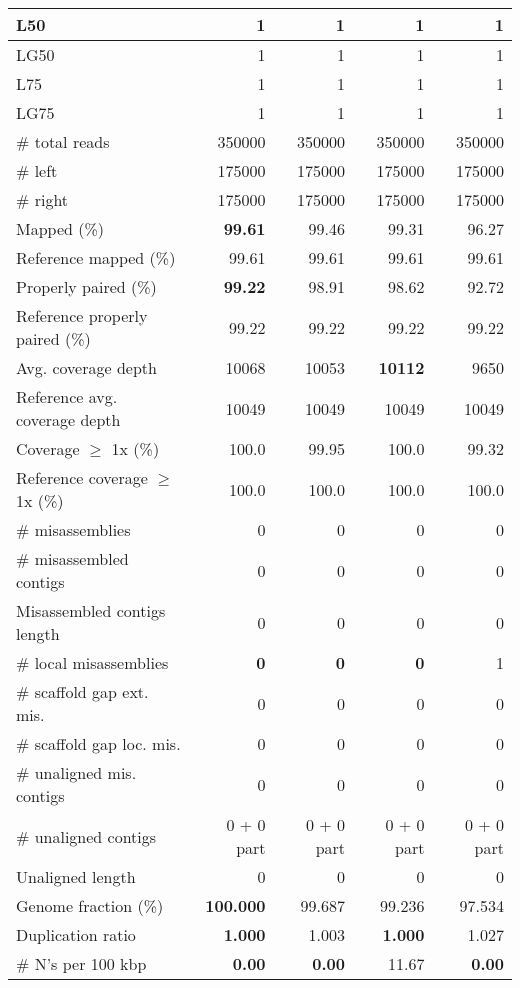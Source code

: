 \documentclass[12pt,a4paper]{article}
\begin{document}
\begin{table}[ht]
\begin{center}
\begin{tabular}{|l*{4}{|r}|}
L50 & 1 & 1 & 1 & 1 \\ \hline
LG50 & 1 & 1 & 1 & 1 \\ \hline
L75 & 1 & 1 & 1 & 1 \\ \hline
LG75 & 1 & 1 & 1 & 1 \\ \hline
\# total reads & 350000 & 350000 & 350000 & 350000 \\ \hline
\# left & 175000 & 175000 & 175000 & 175000 \\ \hline
\# right & 175000 & 175000 & 175000 & 175000 \\ \hline
Mapped (\%) & {\bf 99.61} & 99.46 & 99.31 & 96.27 \\ \hline
Reference mapped (\%) & 99.61 & 99.61 & 99.61 & 99.61 \\ \hline
Properly paired (\%) & {\bf 99.22} & 98.91 & 98.62 & 92.72 \\ \hline
Reference properly paired (\%) & 99.22 & 99.22 & 99.22 & 99.22 \\ \hline
Avg. coverage depth & 10068 & 10053 & {\bf 10112} & 9650 \\ \hline
Reference avg. coverage depth & 10049 & 10049 & 10049 & 10049 \\ \hline
Coverage $\geq$ 1x (\%) & 100.0 & 99.95 & 100.0 & 99.32 \\ \hline
Reference coverage $\geq$ 1x (\%) & 100.0 & 100.0 & 100.0 & 100.0 \\ \hline
\# misassemblies & 0 & 0 & 0 & 0 \\ \hline
\# misassembled contigs & 0 & 0 & 0 & 0 \\ \hline
Misassembled contigs length & 0 & 0 & 0 & 0 \\ \hline
\# local misassemblies & {\bf 0} & {\bf 0} & {\bf 0} & 1 \\ \hline
\# scaffold gap ext. mis. & 0 & 0 & 0 & 0 \\ \hline
\# scaffold gap loc. mis. & 0 & 0 & 0 & 0 \\ \hline
\# unaligned mis. contigs & 0 & 0 & 0 & 0 \\ \hline
\# unaligned contigs & 0 + 0 part & 0 + 0 part & 0 + 0 part & 0 + 0 part \\ \hline
Unaligned length & 0 & 0 & 0 & 0 \\ \hline
Genome fraction (\%) & {\bf 100.000} & 99.687 & 99.236 & 97.534 \\ \hline
Duplication ratio & {\bf 1.000} & 1.003 & {\bf 1.000} & 1.027 \\ \hline
\# N's per 100 kbp & {\bf 0.00} & {\bf 0.00} & 11.67 & {\bf 0.00} \\ \hline

\end{tabular}
\end{center}
\end{table}
\end{document}
